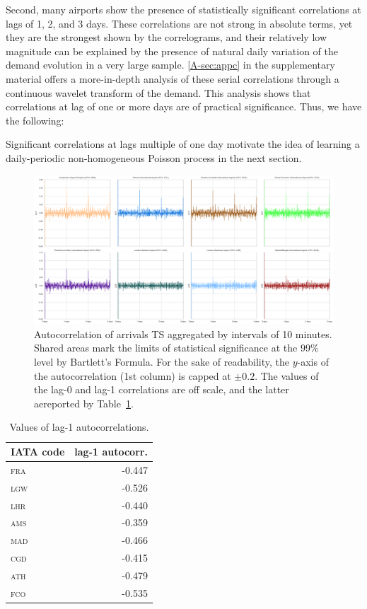 \documentclass[final,review]{elsarticle}
\newcommand{\airp}[1]{\textcolor{#1}{\textsc{#1}}}
\begin{document}
Second, many airports show the presence of statistically significant correlations at lags of 1, 2, and 3 days.
These correlations are not strong in absolute terms, yet they are the strongest shown by the correlograms, and their relatively low magnitude can be explained by the presence of natural daily variation of the demand evolution in a very large sample.
\ref{A-sec:appc} in the supplementary material offers a more-in-depth analysis of these serial correlations through a continuous wavelet transform of the demand. This analysis shows that correlations at lag of one or more days are of practical significance. Thus, we have the following:
\begin{kpt}\label{rmk:correlations}
  Significant correlations at lags multiple of one day motivate the idea of learning a daily-periodic non-homogeneous Poisson process in the next section.
\end{kpt}

\begin{figure}
  \includegraphics[width=\textwidth]{Autocorr}
  \caption{Autocorrelation of arrivals \ac{TS} aggregated by intervals of 10 minutes. Shared areas mark the limits of statistical significance at the 99\% level by Bartlett's Formula. For the sake of readability, the \(y\)-axis of the autocorrelation (1st column) is capped at \(\pm 0.2\). The values of the lag-0 and lag-1 correlations are off scale, and the latter aereported by Table~\ref{tab:lag01}.}\label{fig:autocorr}
\end{figure}

\begin{table}[tbp]
  \centering
  \caption{Values of lag-1 autocorrelations.}\label{tab:lag01}
  \begin{tabular}{lr}
    \toprule
    \acs{IATA} code & lag-1 autocorr.\\
    \midrule
    \airp{fra} & -0.447\\
    \airp{lgw} & -0.526\\
    \airp{lhr} & -0.440\\
    \airp{ams} & -0.359\\
    \airp{mad} & -0.466\\
    \airp{cgd} & -0.415\\
    \airp{ath} & -0.479\\
    \airp{fco} & -0.535\\
    \bottomrule
  \end{tabular}
\end{table}
\end{document}
